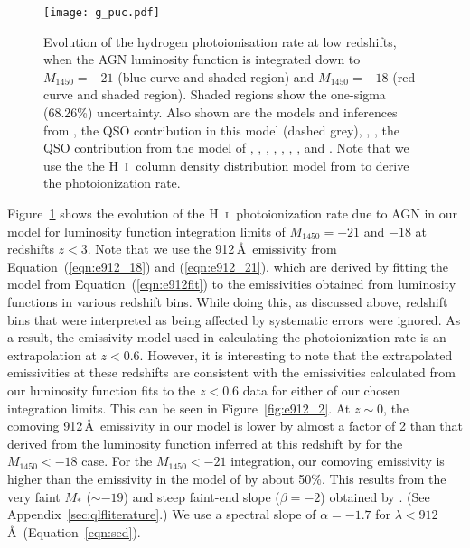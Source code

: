 \documentclass[fleqn,usenatbib]{mnras}
\def\HI{\hbox{H~$\scriptstyle\rm I$}}
\begin{document}
\begin{figure}
  \begin{center}
    \texttt{[image: g\_puc.pdf]}
  \end{center}
  \caption{Evolution of the hydrogen photoionisation rate at low
    redshifts, when the AGN luminosity function is integrated down to
    $M_{1450}=-21$ (blue curve and shaded region) and $M_{1450}=-18$
    (red curve and shaded region).  Shaded regions show the one-sigma
    (68.26\%) uncertainty.  Also shown are the models and inferences
    from \citet[dotted brown curve]{2012ApJ...746..125H}, the QSO
    contribution in this model (dashed grey), \citet[dotted
      green]{2015ApJ...813L...8M}, \citet[dashed
      black]{2015ApJ...811....3S}, the QSO contribution from the model
    of \citet[dashed orange]{2015MNRAS.451L..30K}, \citet[dotted
      grey]{2017ApJ...837..106O}, \citet[dashed
      brown]{2018arXiv180104931P}, \citet[yellow
      box]{2017MNRAS.467.4802F}, \citet[black
      box]{2017MNRAS.467L..86V}, \citet[inverted
      triangle]{2013MNRAS.436.1023B},
    \citet[pentagon]{2014ApJ...789L..32K}, and
    \citet[circle]{2017MNRAS.467.3172G}. Note that we use the the
    \HI\ column density distribution model from
    \citet{2012ApJ...746..125H} to derive the photoionization rate.
    \label{fig:puc}}
\end{figure}

Figure~\ref{fig:puc} shows the evolution of the \HI\ photoionization
rate due to AGN in our model for luminosity function integration
limits of $M_{1450}=-21$ and $-18$ at redshifts $z<3$.  Note that we
use the 912\,\AA\ emissivity from Equation~(\ref{eqn:e912_18}) and
(\ref{eqn:e912_21}), which are derived by fitting the model from
Equation~(\ref{eqn:e912fit}) to the emissivities obtained from
luminosity functions in various redshift bins.  While doing this, as
discussed above, redshift bins that were interpreted as being affected
by systematic errors were ignored.  As a result, the emissivity model
used in calculating the photoionization rate is an extrapolation at
$z<0.6$.  However, it is interesting to note that the extrapolated
emissivities at these redshifts are consistent with the emissivities
calculated from our luminosity function fits to the $z<0.6$ data for
either of our chosen integration limits.  This can be seen in
Figure~\ref{fig:e912_2}.  At $z\sim 0$, the comoving
912\,\AA\ emissivity in our model is lower by almost a factor of 2
than that derived from the luminosity function inferred at this
redshift by \citet{2009A&A...507..781S} for the $M_{1450}<-18$ case.
For the $M_{1450}<-21$ integration, our comoving emissivity is higher
than the emissivity in the model of \citet{2009A&A...507..781S} by
about 50\%.  This results from the very faint $M_*$ ($\sim -19$) and
steep faint-end slope ($\beta=-2$) obtained by
\citet{2009A&A...507..781S}.  (See Appendix~\ref{sec:qlfliterature}.)
We use a spectral slope of $\alpha=-1.7$ for
$\lambda<912$\,\AA\ (Equation~\ref{eqn:sed}).
\end{document}
